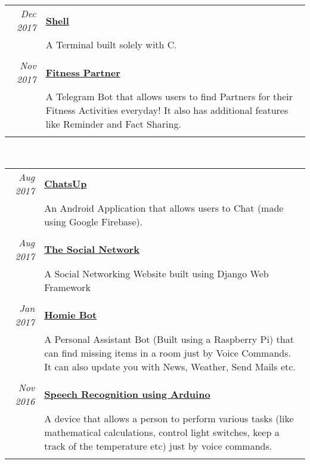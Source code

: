\documentclass[a4paper,10pt]{article}
\begin{document}
 \begin{tabular}{r|p{14.5cm}}
 \emph{Dec 2017} & \href{https://shell.yashitm.tech}{\textbf{Shell}} \\&\normalsize{A Terminal built solely with C.}\\\multicolumn{2}{c}{} \\
 \emph{Nov 2017} & \href{https://fitnesspartner.yashitm.tech}{\textbf{Fitness Partner}} \\&\normalsize{A Telegram Bot that allows users to find Partners for their Fitness Activities everyday! It also has additional features like Reminder and Fact Sharing.}\\\multicolumn{2}{c}{} \\
\end{tabular}\\
\begin{tabular}{r|p{14.5cm}}
 \emph{Aug 2017} & \href{https://github.com/YashitM/ChatsUp}{\textbf{ChatsUp}} \\&\normalsize{An Android Application that allows users to Chat (made using Google Firebase).}\\\multicolumn{2}{c}{} \\ 
 \emph{Aug 2017} & \href{https://github.com/abhay-tyagi/Social_Network}{\textbf{The Social Network}} \\&\normalsize{A Social Networking Website built using Django Web Framework}\\\multicolumn{2}{c}{} \\
 \emph{Jan 2017} & \href{https://homiebot.yashitm.tech}{\textbf{Homie Bot}} \\&\normalsize{A Personal Assistant Bot (Built using a Raspberry Pi) that can find missing items in a room just by Voice Commands. It can also update you with News, Weather, Send Mails etc.}\\\multicolumn{2}{c}{} \\
 \emph{Nov 2016} & \href{https://github.com/YashitM/Arduino-Speech-Recog}{\textbf{Speech Recognition using Arduino}} \\&\normalsize{A device that allows a person to perform various tasks (like mathematical calculations, control light switches, keep a track of the temperature etc) just by voice commands.}\\\multicolumn{2}{c}{} \\
\end{tabular}
\end{document}
